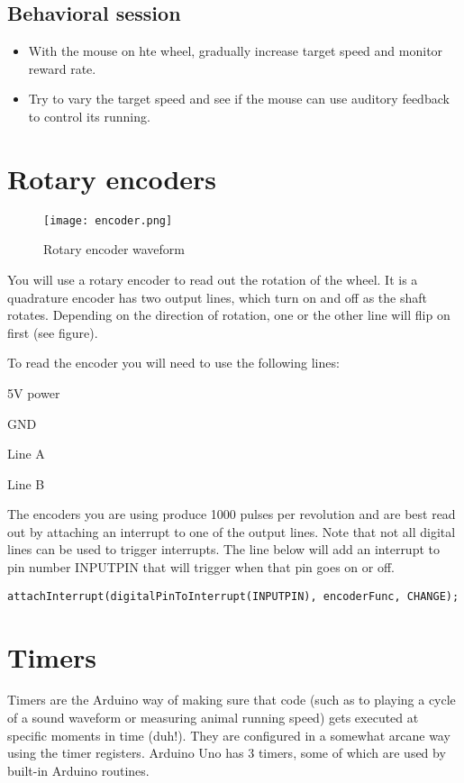 \documentclass[a4paper,10pt]{article}
\begin{document}
\subsection{Behavioral session}
\begin{itemize}
 \item With the mouse on hte wheel, gradually increase target speed and monitor reward rate.
 \item Try to vary the target speed and see if the mouse can use auditory feedback to control its running.
\end{itemize}
\pagebreak
\section{Rotary encoders}
\begin{figure}[here]
\texttt{[image: encoder.png]}
\caption{Rotary encoder waveform}
\end{figure}

You will use a rotary encoder to read out the rotation of the wheel. It is a quadrature encoder has 
two output lines, which turn on and off as the shaft rotates. Depending on the direction
of rotation, one or the other line will flip on first (see figure). 

To read the encoder you will need to use the following lines:

\begin{description}[align=right]
\item [BROWN] 5V power
\item [WHITE] GND
\item [GRAY] Line A
\item [GREEN] Line B
\end{description}

The encoders you are using produce 1000 pulses per revolution and are best read out by attaching
an interrupt to one of the output lines. Note that not all digital lines can be used to trigger
interrupts. The line below will add an interrupt to pin number INPUTPIN that will trigger
when that pin goes on or off.

\begin{lstlisting}
attachInterrupt(digitalPinToInterrupt(INPUTPIN), encoderFunc, CHANGE);
\end{lstlisting}

\section{Timers}
Timers are the Arduino way of making sure that code (such as to playing a cycle of a sound 
waveform or measuring animal running speed) gets executed at specific moments in time (duh!).
They are configured in a somewhat arcane way using the timer registers. Arduino Uno has 3 timers,
some of which are used by built-in Arduino routines.
\end{document}
